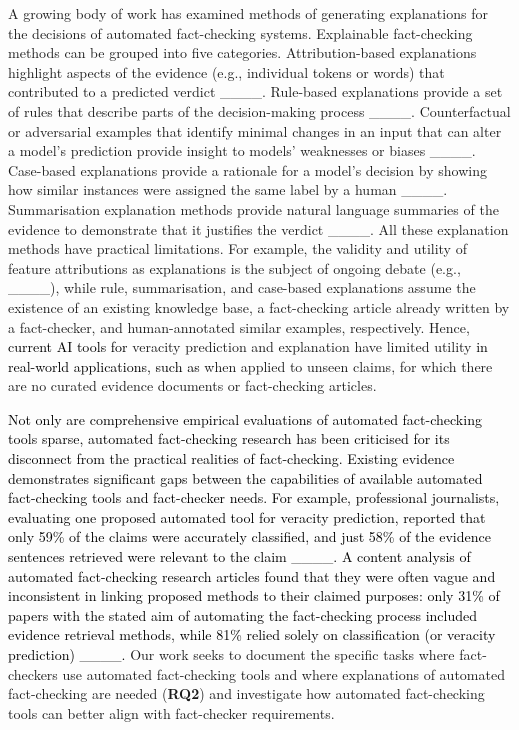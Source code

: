 A growing body of work has examined methods of generating explanations for the decisions of automated fact-checking systems.
Explainable fact-checking methods can be grouped into five categories.
Attribution-based explanations highlight aspects of the evidence (e.g., individual tokens or words) that contributed to a predicted verdict ____.
Rule-based explanations provide a set of rules that describe parts of the decision-making process ____.
Counterfactual or adversarial examples that identify minimal changes in an input that can alter a model's prediction provide insight to models' weaknesses or biases ____.
Case-based explanations provide a rationale for a model's decision by showing how similar instances were assigned the same label by a human ____.
Summarisation explanation methods provide natural language summaries of the evidence to demonstrate that it justifies the verdict ____.
All these explanation methods have practical limitations.
For example, the validity and utility of feature attributions as explanations is the subject of ongoing debate (e.g., ____), while rule, summarisation, and case-based explanations assume the existence of an existing knowledge base, a fact-checking article already written by a fact-checker, and human-annotated similar examples, respectively.
Hence, \textcolor{black}{current AI tools for} veracity prediction and explanation have limited utility \textcolor{black}{in real-world applications, such as}  when applied to unseen claims, for which there are no curated evidence documents or fact-checking articles.


\textcolor{black}{Not only are comprehensive empirical evaluations of automated fact-checking tools sparse, automated fact-checking research has been criticised for its disconnect from the practical realities of fact-checking. Existing evidence demonstrates significant gaps between the capabilities of available automated fact-checking tools and fact-checker needs.
For example, professional journalists, evaluating one proposed automated tool for veracity prediction, reported that only 59\% of the claims were accurately classified, and just 58\% of the evidence sentences retrieved were relevant to the claim ____.
A content analysis of automated fact-checking research articles found that they were often vague and inconsistent in linking proposed methods to their claimed purposes: only 31\% of papers with the stated aim of automating the fact-checking process included evidence retrieval methods, while 81\% relied solely on classification (or veracity prediction)  ____.
}
Our work seeks to document the specific tasks where fact-checkers use automated fact-checking tools and where explanations of automated fact-checking are needed (\textbf{RQ2}) and investigate how automated fact-checking tools can better align with fact-checker requirements.



